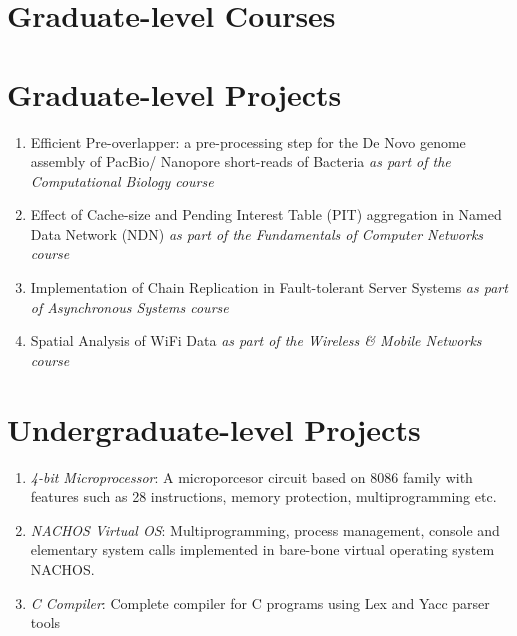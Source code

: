 \documentclass[]{friggeri-cv} %
\begin{document}
\section{Graduate-level Courses}
\begin{entrylist}
\end{entrylist}
\section{Graduate-level Projects} 
\begin{enumerate}
  \item Efficient Pre-overlapper: a pre-processing step for the De Novo
  genome assembly of PacBio/ Nanopore short-reads of Bacteria  
  \textit{as part of the Computational Biology course}
  \item Effect of Cache-size and Pending Interest Table (PIT) aggregation in
  Named Data Network (NDN) \textit{as part of the Fundamentals of Computer
  Networks course} 
  \item Implementation of Chain Replication in Fault-tolerant Server Systems
  \textit{as part of Asynchronous Systems course}
  \item Spatial Analysis of WiFi Data \textit{as part of the Wireless \& Mobile
  Networks course}
\end{enumerate}
\section{Undergraduate-level Projects}
	\begin{enumerate}
	\item \textit{4-bit Microprocessor}: A microporcesor circuit based on 8086
	family with features such as 28 instructions, memory protection,
	multiprogramming etc. 
	\item \textit{NACHOS Virtual OS}: Multiprogramming,
	process management, console and elementary system calls implemented in
	bare-bone virtual operating system NACHOS.
	\item \textit{C Compiler}: Complete compiler for C programs using Lex and
	Yacc parser tools
	\end{enumerate} 
\end{document}
